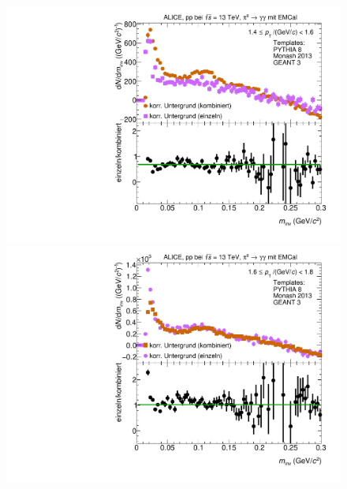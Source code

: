\begin{figure}[h!]
\begin{multicols}{2}
	\centering
    \includegraphics[width=.65\linewidth]{Anhang/BackgroundWithRatio01_Data_2016.pdf}\par 
    \includegraphics[width=.65\linewidth]{Anhang/BackgroundWithRatio02_Data_2016.pdf}\par 
\end{multicols}
\end{figure}
\clearpage

